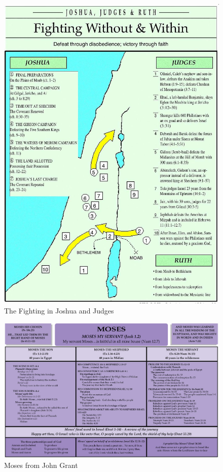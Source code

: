 \newpage
\begin{figure}
\begin{center}
\includegraphics[scale=.5, angle=0]{06OT-Joshua/References/11.FightingInJoshuaAndJudges.jpg}
\caption[The Fighting in Joshua and Judges]{The Fighting in Joshua and Judges}
\label{fig:The Fighting in Joshua and Judges}
\end{center}
\end{figure}

\newpage
\begin{figure}
\begin{center}
\includegraphics[scale=.4, angle=90]{06OT-Joshua/References/12.JohnGrantMoses.jpg}
\caption[Moses from John Grant]{Moses from John Grant}
\label{fig:Moses from John Grant}
\end{center}
\end{figure}





